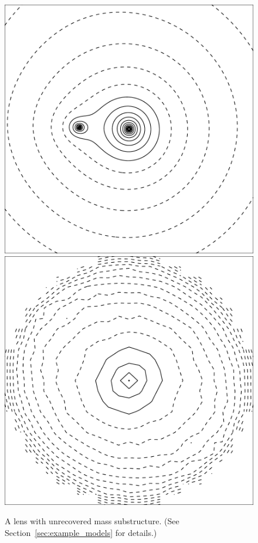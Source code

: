 \documentclass[usenatbib]{mn2e}
\newcommand{\secref}[1]{Section~\ref{sec:#1}}
\newlength{\myplotswidth}
\begin{document}
\begin{figure}
  \includegraphics[width=\myplotswidth]{fig/ASW000195x_006975_kappa}
  \includegraphics[width=\myplotswidth]{fig/006975_mass}
  \caption[result 6975 (ASW000195x)]{A lens with unrecovered mass
    substructure. (See \secref{example_models} for details.)}
  \label{fig:6975}
\end{figure}
  
\end{document}
